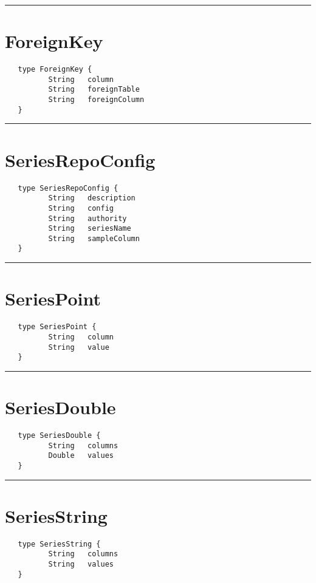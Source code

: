 \rule{15cm}{2pt}
\section{ForeignKey}
\label{type:ForeignKey}

\begin{verbatim}
   type ForeignKey {
          String   column
          String   foreignTable
          String   foreignColumn
   }
\end{verbatim}

\rule{15cm}{2pt}
\section{SeriesRepoConfig}
\label{type:SeriesRepoConfig}

\begin{verbatim}
   type SeriesRepoConfig {
          String   description
          String   config
          String   authority
          String   seriesName
          String   sampleColumn
   }
\end{verbatim}

\rule{15cm}{2pt}
\section{SeriesPoint}
\label{type:SeriesPoint}

\begin{verbatim}
   type SeriesPoint {
          String   column
          String   value
   }
\end{verbatim}

\rule{15cm}{2pt}
\section{SeriesDouble}
\label{type:SeriesDouble}

\begin{verbatim}
   type SeriesDouble {
          String   columns
          Double   values
   }
\end{verbatim}

\rule{15cm}{2pt}
\section{SeriesString}
\label{type:SeriesString}

\begin{verbatim}
   type SeriesString {
          String   columns
          String   values
   }
\end{verbatim}

